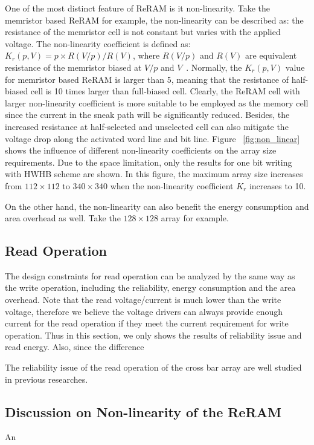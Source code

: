 One of the most distinct feature of ReRAM is it non-linearity. Take the memristor based ReRAM for example, the non-linearity can be described as: the resistance of the memristor cell is not constant but varies with the applied voltage. The non-linearity coefficient is defined as:
$K_r(p,V) = p \times R(V/p)/R(V)$, where $R(V/p)$ and $R(V)$ are equivalent resistance of the memristor biased at $V/p$ and $V$~\cite{memristor:Cong}. Normally, the $K_r(p,V)$ value for memristor based ReRAM is larger than 5, meaning that the resistance of half-biased  cell is 10 times larger than full-biased cell. Clearly, the ReRAM cell with larger non-linearity coefficient is more suitable to be employed as the memory cell since the current in the sneak path will be significantly reduced. Besides, the increased resistance at half-selected and unselected cell can also mitigate the voltage drop along the activated word line and bit line. Figure ~\ref{fig:non_linear} shows the influence of different non-linearity coefficients on the array size requirements. Due to the space limitation, only the results for one bit writing with HWHB scheme are shown. In this figure, the maximum array size increases from $112 \times 112$ to $340 \times 340$ when the non-linearity coefficient $K_r$ increases to 10. 

On the other hand, the non-linearity can also benefit the energy consumption and area overhead as well. Take the $128 \times 128$ array for example. 



\subsection{Read Operation}
The design constraints for read operation can be analyzed by the same way as the write operation, including the reliability, energy consumption and the area overhead. Note that the read voltage/current is much lower than the write voltage, therefore we believe the voltage drivers can always provide enough current for the read operation if they meet the current requirement for write operation. Thus in this section, we only shows the results of reliability issue and read energy. Also, since the difference    

The reliability issue of the read operation of the cross bar array are well studied in previous researches. 


\subsection{Discussion on Non-linearity of the ReRAM}
An
